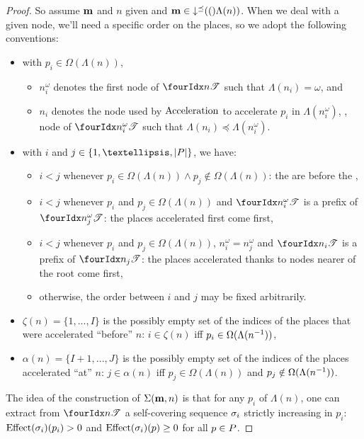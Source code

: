 \begin{proof}
  So assume $\mathbf{m}$ and $n$ given and $\mathbf{m} \in \operatorname{\downarrow^\preceq}(()\Lambda(n))$.
  When we deal with a given node, we'll need a specific order on the places, so we adopt the following conventions:
  \begin{itemize}
    \item with $p_i \in \Omega(\Lambda(n))$,
      \begin{itemize}
        \item $n^\omega_i$ denotes the first node of $\treepath{n}$ such that $\Lambda(n_i) = \omega$, and
        \item $n_i$ denotes the node used by $\operatorname{Acceleration}$ to accelerate $p_i$ in $\Lambda(n^\omega_i)$, ,  node of $\treepath{n^\omega_i}$ such that $\Lambda(n_i) \preceq \Lambda(n^\omega_i)$.
      \end{itemize}
    \item with $i$ and $j \in \{1, …, \card{\places}\}$, we have:
      \begin{itemize}
        \item $i < j$ whenever $p_i \in \Omega(\Lambda(n)) \wedge p_j \notin \Omega(\Lambda(n))$:
          the \oplaces are before the \noplaces,
        \item $i < j$ whenever $p_i$ and $p_j \in \Omega(\Lambda(n))$ and $\treepath{n^\omega_i}$ is a prefix of $\treepath{n^\omega_j}$:
          the places accelerated first come first,
        \item $i < j$ whenever $p_i$ and $p_j \in \Omega(\Lambda(n))$, $n^\omega_i = n^\omega_j$ and $\treepath{n_i}$ is a prefix of $\treepath{n_j}$:
          the places accelerated thanks to nodes nearer of the root come first,
        \item otherwise, the order between $i$ and $j$ may be fixed arbitrarily.
      \end{itemize}
    \item $\zeta(n) = \{1, ..., I\}$ is the possibly empty set of the indices of the places that were accelerated ``before'' $n$: $i \in \zeta(n)$ iff $p_i \in \Omega(\Lambda(n^{-1}))$,
    \item $\alpha(n) = \{I+1, ..., J\}$ is the possibly empty set of the indices of the places accelerated ``at'' $n$: $j \in \alpha(n)$ iff $p_j \in \Omega(\Lambda(n))$ and $p_j \notin \Omega(\Lambda(n^{-1}))$.
  \end{itemize}

  The idea of the construction of $\Sigma(\mathbf{m}, n)$ is that for any \oplace $p_i$ of $\Lambda(n)$, one can extract from $\treepath{n}$ a self-covering sequence $\seqt_i$ strictly increasing in $p_i$:
  $\Effect(\seqt_i)(p_i) > 0$ and $\Effect(\seqt_i)(p) \geq 0$ for all $p \in P$.


\end{proof}
